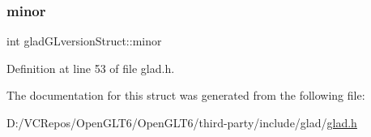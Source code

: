 \subsubsection{\texorpdfstring{minor}{minor}}
{\footnotesize\ttfamily int glad\+G\+Lversion\+Struct\+::minor}



Definition at line 53 of file glad.\+h.



The documentation for this struct was generated from the following file\+:\begin{DoxyCompactItemize}
\item 
D\+:/\+V\+C\+Repos/\+Open\+G\+L\+T6/\+Open\+G\+L\+T6/third-\/party/include/glad/\mbox{\hyperlink{glad_8h}{glad.\+h}}\end{DoxyCompactItemize}
